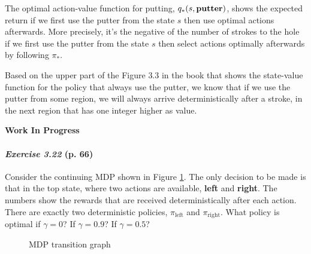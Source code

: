 \documentclass[10pt,a4paper]{article}
\begin{document}
\bigskip
The optimal action-value function for putting, $q_*(s, \textrm{\textbf{putter}})$, shows the expected return if we first use the putter from the state $s$ then use optimal actions afterwards. More precisely, it's the negative of the number of strokes to the hole if we first use the putter from the state $s$ then select actions optimally afterwards by following $\pi_*$.

Based on the upper part of the Figure $3.3$ in the book that shows the state-value function for the policy that always use the putter, we know that if we use the putter from some region, we will always arrive deterministically after a stroke, in the next region that has one integer higher as value.

\textbf{Work In Progress}

\paragraph{\textit{Exercise 3.22} (p. 66)} 

Consider the continuing MDP shown in Figure \ref{mdp_transition_graph}. The only decision to be made is that in the top state, where two actions are available, \textbf{left} and \textbf{right}. The numbers show the rewards that are received deterministically after each action. There are exactly two deterministic policies,
$\pi_\textrm{left}$ and $\pi_\textrm{right}$. What policy is optimal if $\gamma = 0$? If $\gamma = 0.9$?
If $\gamma = 0.5$?

\begin{figure}[h!]
\centering
{}
\caption{MDP transition graph}
\label{mdp_transition_graph}
\end{figure}
\end{document}
